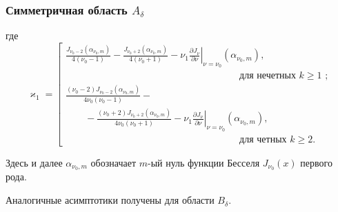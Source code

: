 \begin{frame}
\frametitle{Симметричная область $A_\delta$} 
\begin{mytheorem}[продолжение]

где
\begin{equation*}
    \varkappa_1 = 
    \left[
\begin{array}{ll}
\frac{J_{\nu_0-2}(\alpha_{\nu_0, m})}{4(\nu_0-1)} - \frac{J_{\nu_0+2}(\alpha_{\nu_0, m})}{4(\nu_0+1)} 
  - \nu_1 \left.\frac{\partial J_\nu}{\partial \nu}\right|_{\nu=\nu_0}(\alpha_{\nu_0, m}), \\
  \qquad \qquad \qquad \qquad \qquad \qquad \qquad \qquad \qquad  \text{для нечетных $k\geq 1$ ;} \\[10pt]
\frac{(\nu_0 - 2)J_{\nu_0-2}(\alpha_{\nu_0, m})   }{4\nu_0 (\nu_0-1)} -\\
\qquad - \frac{(\nu_0 + 2)J_{\nu_0+2}(\alpha_{\nu_0, m})}{4\nu_0 (\nu_0+1)}  
- \nu_1 \left.\frac{\partial J_\nu}{\partial \nu}\right|_{\nu = \nu_0}(\alpha_{\nu_0, m}), \\
  \qquad \qquad \qquad \qquad \qquad \qquad \qquad \qquad \qquad  \text{для четных $k \geq 2$}.        
\end{array}
\right.
\end{equation*}

Здесь и далее $\alpha_{\nu_0,m}$ обозначает  $m$-ый нуль функции Бесселя  $J_{\nu_0}(x)$ первого рода.
\end{mytheorem}

Аналогичные асимптотики получены для  области $B_\delta$.
\end{frame} 
 


